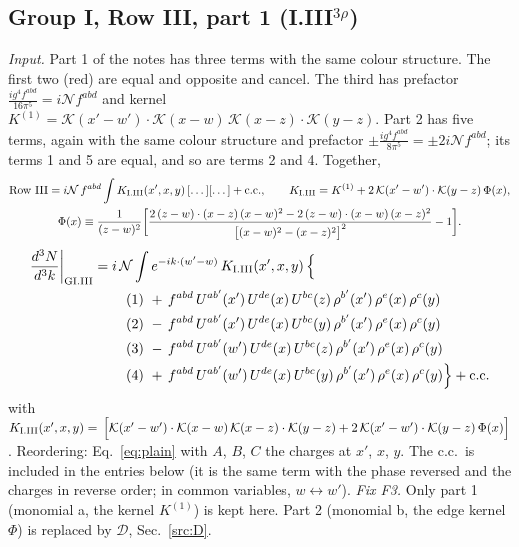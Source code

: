 \documentclass[10pt]{article}
\numberwithin{equation}{section}
\newcommand{\KK}{\mathcal K}
\newcommand{\NN}{\mathcal N}
\begin{document}
\subsection{Group I, Row III, part 1 \texorpdfstring{(I.III$^{3\rho}$)}{}}\label{src:3:I.III}
\emph{Input.} Part 1 of the notes has three terms with the same colour structure. The first two (red) are equal and opposite and cancel. The third has prefactor $\frac{ig^4f^{abd}}{16\pi^5}=i\NN f^{abd}$ and kernel $K^{(1)}=\KK(x'-w')\cdot\KK(x-w)\,\KK(x-z)\cdot\KK(y-z)$. Part 2 has five terms, again with the same colour structure and prefactor $\pm\frac{ig^4f^{abd}}{8\pi^5}=\pm2i\NN f^{abd}$; its terms 1 and 5 are equal, and so are terms 2 and 4. Together,
\begin{gather*}
\text{Row III}=i\NN\,f^{abd}\int K_{\rm I.III}(x',x,y)\,[\dots][\dots]+{\rm c.c.},\qquad K_{\rm I.III}=K^{(1)}+2\,\KK(x'-w')\cdot\KK(y-z)\,\Phi(x),\\
\Phi(x)\equiv\frac{1}{(z-w)^2}\bigg[\frac{2\,(z-w)\cdot(x-z)\,(x-w)^2-2\,(z-w)\cdot(x-w)\,(x-z)^2}{\big[(x-w)^2-(x-z)^2\big]^2}-1\bigg].
\end{gather*}
\begin{align}
\frac{d^3N}{d^3k}\bigg|_{\rm GI.III}={}&i\,\NN\int e^{-ik\cdot(w'-w)}\,K_{\rm I.III}(x',x,y)\,\Big\{\notag\\
&\quad (1)\ +\,f^{abd}\,U^{ab'}(x')\,U^{de}(x)\,U^{bc}(z)\,\rho^{b'}(x')\,\rho^{e}(x)\,\rho^{c}(y)\notag\\
&\quad (2)\ -\,f^{abd}\,U^{ab'}(x')\,U^{de}(x)\,U^{bc}(y)\,\rho^{b'}(x')\,\rho^{e}(x)\,\rho^{c}(y)\notag\\
&\quad (3)\ -\,f^{abd}\,U^{ab'}(w')\,U^{de}(x)\,U^{bc}(z)\,\rho^{b'}(x')\,\rho^{e}(x)\,\rho^{c}(y)\notag\\
&\quad (4)\ +\,f^{abd}\,U^{ab'}(w')\,U^{de}(x)\,U^{bc}(y)\,\rho^{b'}(x')\,\rho^{e}(x)\,\rho^{c}(y)\Big\}+{\rm c.c.}\label{eq:in-GI.III}
\end{align}
with $K_{\rm I.III}(x',x,y)=\,\Big[\KK(x'-w')\cdot\KK(x-w)\,\KK(x-z)\cdot\KK(y-z)+2\,\KK(x'-w')\cdot\KK(y-z)\,\Phi(x)\Big]$.
Reordering: Eq.~\eqref{eq:plain} with $A$, $B$, $C$ the charges at $x'$, $x$, $y$.
The c.c.\ is included in the entries below (it is the same term with the phase reversed and the charges in reverse order; in common variables, $w\leftrightarrow w'$).
\emph{Fix F3.} Only part 1 (monomial a, the kernel $K^{(1)}$) is kept here. Part 2 (monomial b, the edge kernel $\Phi$) is replaced by $\mathcal D$, Sec.~\ref{src:D}.
\end{document}
